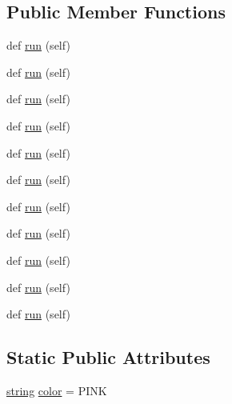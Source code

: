 \subsection*{Public Member Functions}
\begin{DoxyCompactItemize}
\item 
def \hyperlink{classwaflib_1_1_tools_1_1c__config_1_1test__exec_a280e67dce958364efd2d429905b1d948}{run} (self)
\item 
def \hyperlink{classwaflib_1_1_tools_1_1c__config_1_1test__exec_a280e67dce958364efd2d429905b1d948}{run} (self)
\item 
def \hyperlink{classwaflib_1_1_tools_1_1c__config_1_1test__exec_a280e67dce958364efd2d429905b1d948}{run} (self)
\item 
def \hyperlink{classwaflib_1_1_tools_1_1c__config_1_1test__exec_a280e67dce958364efd2d429905b1d948}{run} (self)
\item 
def \hyperlink{classwaflib_1_1_tools_1_1c__config_1_1test__exec_a280e67dce958364efd2d429905b1d948}{run} (self)
\item 
def \hyperlink{classwaflib_1_1_tools_1_1c__config_1_1test__exec_a280e67dce958364efd2d429905b1d948}{run} (self)
\item 
def \hyperlink{classwaflib_1_1_tools_1_1c__config_1_1test__exec_a280e67dce958364efd2d429905b1d948}{run} (self)
\item 
def \hyperlink{classwaflib_1_1_tools_1_1c__config_1_1test__exec_a280e67dce958364efd2d429905b1d948}{run} (self)
\item 
def \hyperlink{classwaflib_1_1_tools_1_1c__config_1_1test__exec_a280e67dce958364efd2d429905b1d948}{run} (self)
\item 
def \hyperlink{classwaflib_1_1_tools_1_1c__config_1_1test__exec_a280e67dce958364efd2d429905b1d948}{run} (self)
\item 
def \hyperlink{classwaflib_1_1_tools_1_1c__config_1_1test__exec_a280e67dce958364efd2d429905b1d948}{run} (self)
\end{DoxyCompactItemize}
\subsection*{Static Public Attributes}
\begin{DoxyCompactItemize}
\item 
\hyperlink{test__lib_f_l_a_c_2format_8c_ab02026ad0de9fb6c1b4233deb0a00c75}{string} \hyperlink{classwaflib_1_1_tools_1_1c__config_1_1test__exec_a45ee180fe8eed668f509dfcdbab62472}{color} = \textquotesingle{}P\+I\+NK\textquotesingle{}
\end{DoxyCompactItemize}
